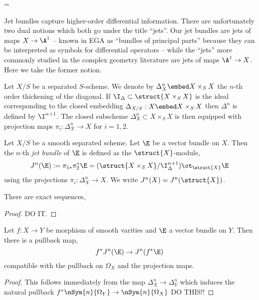 =\documentclass[12pt]{article}
\begin{document}
Jet bundles capture higher-order differential information. There are unfortunately two dual notions which both go under the title ``jets''. Our jet bundles are jets of maps $X \to \A^1$ -- known in EGA as ``bundles of principal parts'' because they can be interpreted as symbols for differential operators  -- while the ``jets'' more commonly studied in the complex geometry literature are jets of maps $\A^1 \to X$. Here we take the former notion. 

\begin{defn}
Let $X /S$ be a separated $S$-scheme. We denote by $\Delta^n_X \embed X \times_S X$ the $n$-th order thickening of the diagonal. If $\I_\Delta \subset \struct{X \times_S X}$ is the ideal corresponding to the closed embedding $\Delta_{X/S} : X \embed X \times_S X$ then $\Delta^n$ is defined by $\I^{n+1}$. The closed subscheme $\Delta^n_X \subset X \times_S X$ is then equipped with projection maps $\pi_i : \Delta^n_X \to X$ for $i = 1,2$.
\end{defn}

\begin{defn}
Let $X / S$ be a smooth separated scheme. Let $\E$ be a vector bundle on $X$. Then the $n$-th \textit{jet bundle} of $\E$ is defined as the $\struct{X}$-module,
\[ J^n(\E) := \pi_{1*} \pi_2^* \E = (\struct{X \times_S X} / \I_\Delta^{n+1}) \ot_{\struct{X}} \E \]
using the projections $\pi_i : \Delta^n_X \to X$. We write $J^n(X) = J^n(\struct{X})$.
\end{defn}

\begin{prop}
There are exact sequences,
\begin{center}
\end{center}
\end{prop}

\begin{proof}
DO IT.
\end{proof}

\begin{prop}
Let $f : X \to Y$ be morphism of smooth varities and $\E$ a vector bundle on $Y$. Then there is a pullback map,
\[ f^* J^n(\E) \to J^n(f^* \E) \]
compatible with the pullback on $\Omega_X$ and the projection maps.
\end{prop}

\begin{proof}
This follows immediately from the map $\Delta_X^n \to \Delta_Y^n$ which induces the natural pullback $f^* \nSym{n}{\Omega_Y} \to \nSym{n}{\Omega_X}$ DO THIS!!
\end{proof}
\end{document}
